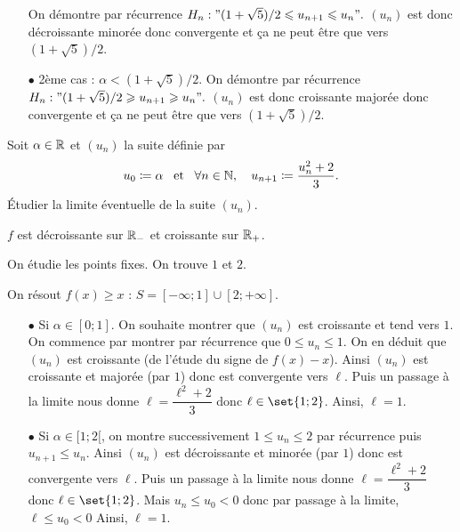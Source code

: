 \documentclass{magnolia}
\begin{document}
\begin{exos}
\begin{sol}
\begin{itemize}
On démontre par récurrence $H_n : "(1+\sqrt{5})/2 \leq u_{n+1}\leq u_n".$
$(u_n)$ est donc décroissante minorée donc convergente et ça ne peut être que vers $(1+\sqrt{5})/2$.
\item[$\bullet$] 2ème cas : $\alpha < (1+\sqrt{5})/2$.
On démontre par récurrence $H_n : "(1+\sqrt{5})/2 \geq u_{n+1}\geq u_n".$
$(u_n)$ est donc croissante majorée donc convergente et ça ne peut être que vers $(1+\sqrt{5})/2$.
\end{itemize}
\end{sol}  
\exo Soit $\alpha\in\R$ et $(u_n)$ la suite définie par
  \[u_0\defeq\alpha \et \forall n\in\N \qsep u_{n+1}\defeq\frac{u_n^2+2}{3}.\]
 Étudier la limite éventuelle de la suite $(u_n)$.

\begin{sol}
$f$ est décroissante sur $\RM$ et croissante sur $\RP$.

On étudie les points fixes. On trouve $1$ et $2$.

On résout $f(x)\geq x$ : $S=[-\infty;1]\cup [2;+\infty]$.

\begin{itemize}
\item[$\bullet$] Si $\alpha \in [0;1]$. On souhaite montrer que $(u_n)$ est croissante et tend vers $1$. 
On commence par montrer par récurrence que $0\leq u_n\leq 1$. On en déduit que $(u_n)$ est croissante (de l'étude du signe de $f(x)-x$). Ainsi $(u_n)$ est croissante et majorée (par $1$) donc est convergente vers $\ell$. Puis un passage à la limite nous donne $\ell=\dfrac{\ell^2+2}{3}$ donc $\ell \in \set{1;2}$. Ainsi, $\ell=1$.


\item[$\bullet$] Si $\alpha \in [1;2[$, on montre successivement $1\leq u_n\leq 2$ par récurrence puis $u_{n+1}\leq u_n$. Ainsi $(u_n)$ est décroissante et minorée (par $1$) donc est convergente vers $\ell$. Puis un passage à la limite nous donne $\ell=\dfrac{\ell^2+2}{3}$ donc $\ell \in \set{1;2}$. Mais $u_n\leq u_0<0$ donc par passage à la limite, $\ell\leq u_0<0$  Ainsi, $\ell=1$.


\end{itemize}
\end{sol}
\end{exos}
\end{document}
